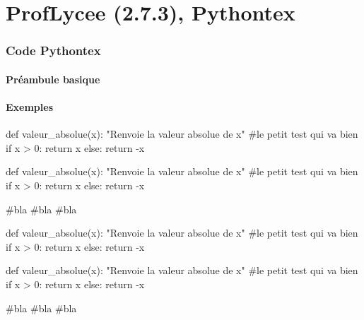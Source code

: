 \documentclass[french,a4paper,10pt]{article}
\def\PLver{2.7.3}
\begin{document}
\part*{ProfLycee (\PLver), Pythontex}

\section{Code \og Pythontex \fg{}}

\subsection{Préambule basique}

{\small {}}

\subsection{Exemples}

{\small \begin{codehigh}
\begin{CodePythontex}{}
def valeur_absolue(x):
    "Renvoie la valeur absolue de x"
    #le petit test qui va bien
    if x > 0:
        return x
    else:
    return -x
\end{CodePythontex}
\end{codehigh}}

\begin{CodePythontex}{}
def valeur_absolue(x):
	"Renvoie la valeur absolue de x"
	#le petit test qui va bien
	if x > 0:
		return x
	else:
		return -x

#bla
#bla
#bla
\end{CodePythontex}

{\small \begin{codehigh}
\begin{CodePythontexAlt}[Largeur=10cm,Centre]{}
def valeur_absolue(x):
    "Renvoie la valeur absolue de x"
    #le petit test qui va bien
    if x > 0:
        return x
    else:
    return -x
\end{CodePythontexAlt}
\end{codehigh}}

\begin{CodePythontexAlt}[Largeur=10cm,Centre]{}
def valeur_absolue(x):
	"Renvoie la valeur absolue de x"
	#le petit test qui va bien
	if x > 0:
		return x
	else:
		return -x

#bla
#bla
#bla
\end{CodePythontexAlt}
\end{document}
